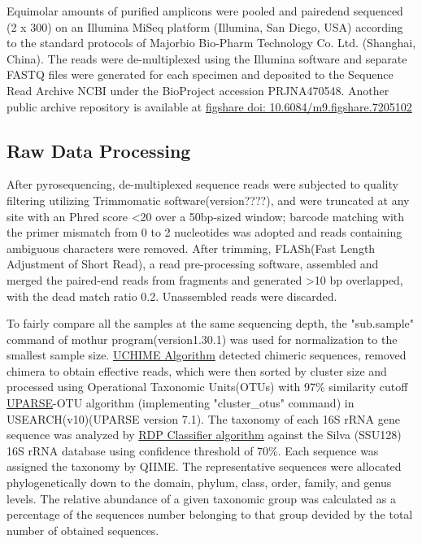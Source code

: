\documentclass[fleqn,10pt,lineno]{wlpeerj} %
\begin{document}
  \noindent
  Equimolar amounts of purified amplicons were pooled and paired\-end sequenced (2 x 300) on an Illumina MiSeq platform (Illumina, San Diego, USA) according to the standard protocols of Majorbio Bio-Pharm Technology Co. Ltd. (Shanghai, China). The reads were de-multiplexed using the Illumina software and separate FASTQ files were generated for each specimen and deposited to the Sequence Read Archive NCBI under the BioProject accession PRJNA470548. Another public archive repository is available at \href{https://figshare.com/articles/Untitled_Item192_samples_for_publishing_Longitudinal_gut_microbiota_patterns_in_preterm_infants_with_necrotizing_enterocolitis_or_late-onset_sepsis_an_observational_prospective_study_/7205102}{figshare doi: 10.6084/m9.figshare.7205102}

  \subsection*{Raw Data Processing}
  After pyrosequencing, de-multiplexed sequence reads were subjected to quality filtering utilizing Trimmomatic software(version????)\citep{bolger2014trimmomatic},  and were truncated at any site with an Phred score \textless 20 over a 50bp-sized window; barcode matching with the primer mismatch from 0 to 2 nucleotides was adopted and reads containing ambiguous characters were removed. After trimming, FLASh(Fast Length Adjustment of Short Read)\citep{magovc2011flash}, a read pre-processing software, assembled and merged the paired-end reads from fragments and generated \textgreater 10 bp overlapped, with the dead match ratio 0.2. Unassembled reads were discarded.

  \noindent
  To fairly compare all the samples at the same sequencing depth, the "sub.sample" command of mothur program(version1.30.1)\citep{schloss2009introducing} was used for normalization to the smallest sample size. \href{https://www.drive5.com/usearch/manual/uchime_algo.html}{UCHIME Algorithm} detected chimeric sequences, removed chimera to obtain effective reads, which were then sorted by cluster size and processed using Operational Taxonomic Units(OTUs) with 97\% similarity cutoff \href{http://drive5.com/uparse/}{UPARSE}-OTU algorithm (implementing "cluster\_otus" command)\citep{edgar2013uparse} in USEARCH(v10)(UPARSE version 7.1). The taxonomy of each 16S rRNA gene sequence was analyzed by \href{http://rdp.cme.msu.edu/}{RDP Classifier algorithm}\citep{wang2007naive} against the Silva (SSU128)\citep{quast2012silva} 16S rRNA database using confidence threshold of 70\%. Each sequence was assigned the taxonomy by QIIME\citep{caporaso2010qiime}. The representative sequences were allocated phylogenetically down to the domain, phylum, class, order, family, and genus levels. The relative abundance of a given taxonomic group was calculated as a percentage of the sequences number belonging to that group devided by the total number of obtained sequences.
\end{document}
